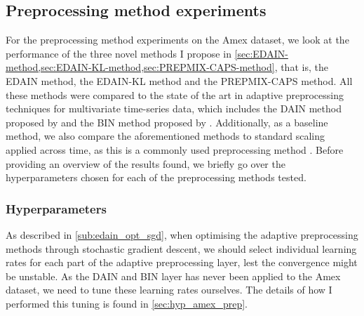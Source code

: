 \documentclass{statsmsc}
\begin{document}
{%

\subsection{Preprocessing method experiments}%
\label{sub:amex_res}

For the preprocessing method experiments on the Amex dataset, we look at the performance of
the three novel methods I propose in \cref{sec:EDAIN-method,sec:EDAIN-KL-method,sec:PREPMIX-CAPS-method}, that is, the \ac{EDAIN} method, the \ac{EDAIN-KL} method and the \ac{PREPMIX-CAPS} method.
All these methods were compared to the state of the art in adaptive preprocessing techniques
for multivariate time-series data, which includes the \ac{DAIN} method proposed
by \cite{dain} and the
\ac{BIN} method proposed by \cite{bin}. Additionally, as a baseline method, we also compare the
aforementioned methods to standard scaling applied across time, as this is a commonly used
preprocessing method \citep{singh,nawi,stanislav}.
Before providing an overview of the results found, we briefly go over the
hyperparameters chosen for each of the preprocessing methods tested.

\subsubsection{Hyperparameters}%
\label{ssub:Learning rate tuning}

As described in \cref{sub:edain_opt_sgd}, when optimising the adaptive preprocessing methods
through stochastic gradient descent, we should select individual learning rates for each part
of the adaptive preprocessing layer, lest the convergence might be unstable.
As the \ac{DAIN} and \ac{BIN} layer has never been applied to the Amex dataset, we need
to tune these learning rates ourselves. The details of how I performed this tuning is found in
\cref{sec:hyp_amex_prep}.

}
\end{document}
